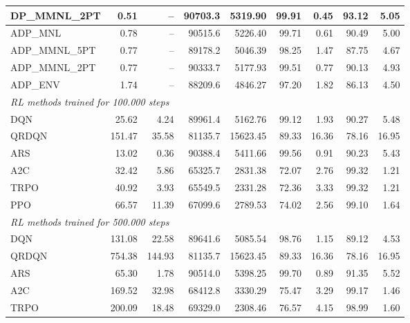 \begin{samepage}
\begin{center}
\begin{tabular}{l|rr|rr|rr|rr}
    DP\_MMNL\_2PT &     0.51 &    -- &    90703.3 &    5319.90 &   99.91 &    0.45 &   93.12 &    5.05 \\
    \midrule
    ADP\_MNL     &     0.78 &    -- &    90515.6 &    5226.40 &   99.71 &    0.61 &   90.49 &    5.00 \\
    ADP\_MMNL\_5PT &     0.77 &    -- &    89178.2 &    5046.39 &   98.25 &    1.47 &   87.75 &    4.67 \\
    ADP\_MMNL\_2PT &     0.77 &    -- &    90333.7 &    5177.93 &   99.51 &    0.77 &   90.13 &    4.93 \\
    ADP\_ENV     &     1.74 &    -- &    88209.6 &    4846.27 &   97.20 &    1.82 &   86.13 &    4.50 \\
    \midrule
    \multicolumn{9}{l}{\textit{RL methods trained for 100.000 steps}} \\
    \midrule
    DQN          &    25.62 &     4.24 &    89961.4 &    5162.76 &   99.12 &    1.93 &   90.27 &    5.48 \\
    QRDQN        &   151.47 &    35.58 &    81135.7 &   15623.45 &   89.33 &   16.36 &   78.16 &   16.95 \\
    ARS          &    13.02 &     0.36 &    90388.4 &    5411.66 &   99.56 &    0.91 &   90.23 &    5.43 \\
    A2C          &    32.42 &     5.86 &    65325.7 &    2831.38 &   72.07 &    2.76 &   99.32 &    1.21 \\
    TRPO         &    40.92 &     3.93 &    65549.5 &    2331.28 &   72.36 &    3.33 &   99.32 &    1.21 \\
    PPO          &    66.57 &    11.39 &    67099.6 &    2789.53 &   74.02 &    2.56 &   99.10 &    1.64 \\
    \midrule
    \multicolumn{9}{l}{\textit{RL methods trained for 500.000 steps}} \\
    \midrule
    DQN          &   131.08 &    22.58 &    89641.6 &    5085.54 &   98.76 &    1.15 &   89.12 &    4.53 \\
    QRDQN        &   754.38 &   144.93 &    81135.7 &   15623.45 &   89.33 &   16.36 &   78.16 &   16.95 \\
    ARS          &    65.30 &     1.78 &    90514.0 &    5398.25 &   99.70 &    0.89 &   91.35 &    5.52 \\
    A2C          &   169.52 &    32.98 &    68412.8 &    3330.29 &   75.47 &    3.29 &   99.17 &    1.46 \\
    TRPO         &   200.09 &    18.48 &    69329.0 &    2308.46 &   76.57 &    4.15 &   98.99 &    1.60 \\

\end{tabular}
\end{center}
\end{samepage}

